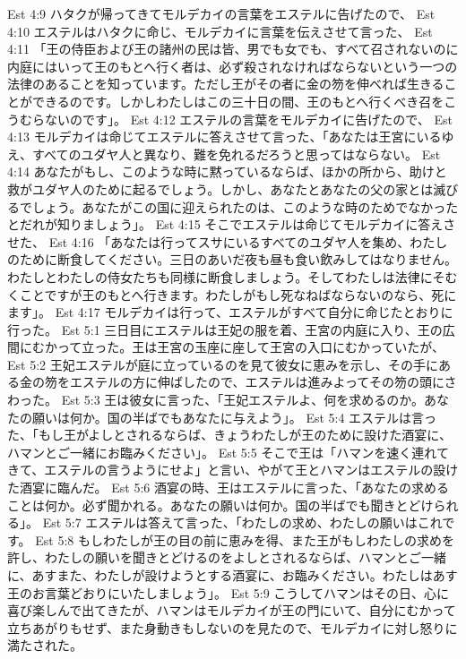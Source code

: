 Est 4:9  ハタクが帰ってきてモルデカイの言葉をエステルに告げたので、
Est 4:10  エステルはハタクに命じ、モルデカイに言葉を伝えさせて言った、
Est 4:11  「王の侍臣および王の諸州の民は皆、男でも女でも、すべて召されないのに内庭にはいって王のもとへ行く者は、必ず殺されなければならないという一つの法律のあることを知っています。ただし王がその者に金の笏を伸べれば生きることができるのです。しかしわたしはこの三十日の間、王のもとへ行くべき召をこうむらないのです」。
Est 4:12  エステルの言葉をモルデカイに告げたので、
Est 4:13  モルデカイは命じてエステルに答えさせて言った、「あなたは王宮にいるゆえ、すべてのユダヤ人と異なり、難を免れるだろうと思ってはならない。
Est 4:14  あなたがもし、このような時に黙っているならば、ほかの所から、助けと救がユダヤ人のために起るでしょう。しかし、あなたとあなたの父の家とは滅びるでしょう。あなたがこの国に迎えられたのは、このような時のためでなかったとだれが知りましょう」。
Est 4:15  そこでエステルは命じてモルデカイに答えさせた、
Est 4:16  「あなたは行ってスサにいるすべてのユダヤ人を集め、わたしのために断食してください。三日のあいだ夜も昼も食い飲みしてはなりません。わたしとわたしの侍女たちも同様に断食しましょう。そしてわたしは法律にそむくことですが王のもとへ行きます。わたしがもし死なねばならないのなら、死にます」。
Est 4:17  モルデカイは行って、エステルがすべて自分に命じたとおりに行った。
Est 5:1  三日目にエステルは王妃の服を着、王宮の内庭に入り、王の広間にむかって立った。王は王宮の玉座に座して王宮の入口にむかっていたが、
Est 5:2  王妃エステルが庭に立っているのを見て彼女に恵みを示し、その手にある金の笏をエステルの方に伸ばしたので、エステルは進みよってその笏の頭にさわった。
Est 5:3  王は彼女に言った、「王妃エステルよ、何を求めるのか。あなたの願いは何か。国の半ばでもあなたに与えよう」。
Est 5:4  エステルは言った、「もし王がよしとされるならば、きょうわたしが王のために設けた酒宴に、ハマンとご一緒にお臨みください」。
Est 5:5  そこで王は「ハマンを速く連れてきて、エステルの言うようにせよ」と言い、やがて王とハマンはエステルの設けた酒宴に臨んだ。
Est 5:6  酒宴の時、王はエステルに言った、「あなたの求めることは何か。必ず聞かれる。あなたの願いは何か。国の半ばでも聞きとどけられる」。
Est 5:7  エステルは答えて言った、「わたしの求め、わたしの願いはこれです。
Est 5:8  もしわたしが王の目の前に恵みを得、また王がもしわたしの求めを許し、わたしの願いを聞きとどけるのをよしとされるならば、ハマンとご一緒に、あすまた、わたしが設けようとする酒宴に、お臨みください。わたしはあす王のお言葉どおりにいたしましょう」。
Est 5:9  こうしてハマンはその日、心に喜び楽しんで出てきたが、ハマンはモルデカイが王の門にいて、自分にむかって立ちあがりもせず、また身動きもしないのを見たので、モルデカイに対し怒りに満たされた。
